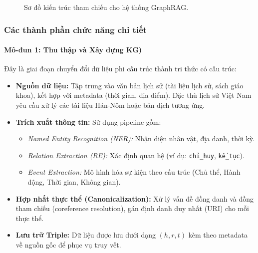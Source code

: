 \begin{figure}[H]
    \centering
    \caption{Sơ đồ kiến trúc tham chiếu cho hệ thống GraphRAG.}
    \label{fig:graphrag_arch}
\end{figure}



\subsubsection{Các thành phần chức năng chi tiết}

\paragraph{Mô-đun 1: Thu thập và Xây dựng KG)}
Đây là giai đoạn chuyển đổi dữ liệu phi cấu trúc thành tri thức có cấu trúc:
\begin{itemize}
    \item \textbf{Nguồn dữ liệu:} Tập trung vào văn bản lịch sử (tài liệu lịch sử, sách giáo khoa), kết hợp với metadata (thời gian, địa điểm). Đặc thù lịch sử Việt Nam yêu cầu xử lý các tài liệu Hán-Nôm hoặc bản dịch tương ứng.
    \item \textbf{Trích xuất thông tin:} Sử dụng pipeline gồm:
    \begin{itemize}
        \item \textit{Named Entity Recognition (NER):} Nhận diện nhân vật, địa danh, thời kỳ.
        \item \textit{Relation Extraction (RE):} Xác định quan hệ (ví dụ: \texttt{chỉ\_huy}, \texttt{kế\_tục}).
        \item \textit{Event Extraction:} Mô hình hóa sự kiện theo cấu trúc (Chủ thể, Hành động, Thời gian, Không gian).
    \end{itemize}
    \item \textbf{Hợp nhất thực thể (Canonicalization):} Xử lý vấn đề đồng danh và đồng tham chiếu (coreference resolution), gán định danh duy nhất (URI) cho mỗi thực thể.
    \item \textbf{Lưu trữ Triple:} Dữ liệu được lưu dưới dạng $(h, r, t)$ kèm theo metadata về nguồn gốc để phục vụ truy vết.
\end{itemize}

